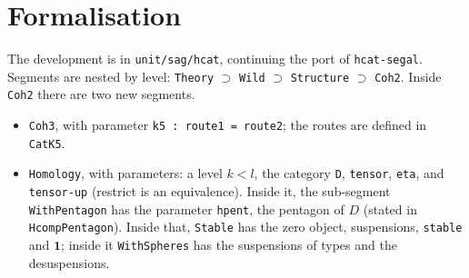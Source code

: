 \documentclass[11pt]{amsart}
\numberwithin{equation}{section}
\theoremstyle{definition}
\theoremstyle{remark}
\newcommand{\code}[1]{\texttt{#1}}
\newcommand{\one}{\mathbf{1}}
\begin{document}
\section{Formalisation}

The development is in \code{unit/sag/hcat}, continuing the port of
\code{hcat-segal}. Segments are nested by level: \code{Theory} $\supset$
\code{Wild} $\supset$ \code{Structure} $\supset$ \code{Coh2}. Inside
\code{Coh2} there are two new segments.
\begin{itemize}
\item \code{Coh3}, with parameter \code{k5 : route1 = route2}; the routes are
  defined in \code{CatK5}.
\item \code{Homology}, with parameters: a level $k<l$, the category
  \code{D}, \code{tensor}, \code{eta}, and \code{tensor-up} (restrict is an
  equivalence). Inside it, the sub-segment \code{WithPentagon} has the
  parameter \code{hpent}, the pentagon of $D$ (stated in
  \code{HcompPentagon}). Inside that, \code{Stable} has the zero object,
  suspensions, \code{stable} and $\one$; inside it \code{WithSpheres} has the
  suspensions of types and the desuspensions.
\end{itemize}
\end{document}
